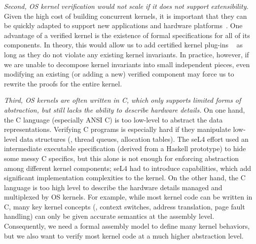 {\em Second, OS kernel verification would not scale if it does not 
support extensibility.} Given the high cost of building concurrent kernels, it is
important that they can be quickly adapted to support new applications
and hardware platforms~\cite{bershad95,engler95,hunt07,unikernel13}. One advantage of a verified
kernel is the existence of formal specifications for all of its
components. In theory, this would allow us to add certified
kernel plug-ins
~\cite{shao10:ctos} 
as long as they do not violate any existing kernel invariants. In
practice, however, if we are unable to decompose kernel invariants
into small independent pieces, even modifying an existing (or adding a
new) verified component may force us to rewrite the proofs for the
entire kernel.


{\em Third, OS kernels are often written in C, which only supports
  limited forms of abstraction,
  but still lacks the ability to describe hardware details.}
On one hand, the C language (especially ANSI C) is
  too low-level to abstract the data representations.
Verifying C programs is
especially hard if they manipulate low-level data structures (\eg,
thread queues, allocation tables). The seL4 effort used an
intermediate executable specification (derived from a Haskell
prototype) to hide some messy C specifics, but this alone is not
enough for enforcing abstraction among different kernel components;
seL4 had to introduce capabilities, which add significant
implementation complexities to the kernel.
On the other hand, the C language is
too high level to describe the hardware details
managed and multiplexed by OS kernels.
For example, while most kernel code
can be written in C, many key kernel concepts (\eg, context switches,
address translation, page fault handling) can only be given accurate
semantics at the assembly level. Consequently, we need a formal
assembly model to define many kernel behaviors, but we also want to
verify most kernel code at a much higher abstraction level.

